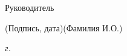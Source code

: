\begin{titlepage}
	\bigskip
	
	\noindent Руководитель  \hfill \underline{\hspace{4cm}}\quad
	\underline{\hspace{0.5cm}\hspace{0.5cm}}
	
	\vspace{-2ex}
	\noindent\hspace{13.5ex}\normalsize\hspace{170pt}\hspace{2ex}\scriptsize{(Подпись, дата)}\normalsize\hspace{30pt}\hspace{6ex}\scriptsize{(Фамилия И.О.)}\normalsize
	\vfill
	
	
	
	
	\begin{center}
		\textsl{\the\year{} г.}
	\end{center}
\end{titlepage}